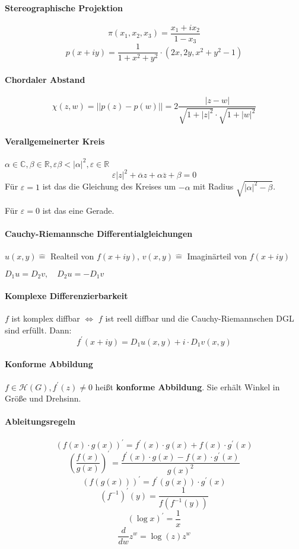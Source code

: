 \documentclass[a4paper, 10pt, DIV20, headings=small]{scrartcl}
\theoremstyle{definition}
\theoremstyle{plain}
\begin{document}
\paragraph{Stereographische Projektion}
$$\pi(x_1,x_2,x_3) = \frac{x_1 + i x_2}{1 - x_3}$$
$$p(x+iy) = \frac{1}{1+x^2+y^2}\cdot (2x, 2y, x^2+y^2-1)$$

\paragraph{Chordaler Abstand}
$$\chi (z,w) = ||p(z)-p(w)|| = 2 \frac{|z-w|}{\sqrt{1+|z|^2} \cdot \sqrt{1+|w|^2}}$$

\paragraph{Verallgemeinerter Kreis}
$\alpha \in \mathbb{C}, \beta \in \mathbb{R}, \varepsilon \beta < |\alpha|^2, \varepsilon \in \mathbb{R}$
$$\varepsilon |z|^2 + \overline{\alpha}z + \alpha \overline{z} + \beta = 0$$
Für $\varepsilon = 1$ ist das die Gleichung des Kreises um $- \alpha$ mit Radius $\sqrt{|\alpha|^2-\beta}$.

Für $\varepsilon = 0$ ist das eine Gerade.

\paragraph{Cauchy-Riemannsche Differentialgleichungen}
$u(x,y) \hat{=}$ Realteil von $f(x+iy)$, 
$v(x,y) \hat{=}$ Imaginärteil von $f(x+iy)$

$D_1u = D_2v,\quad D_2u = -D_1v$

\paragraph{Komplexe Differenzierbarkeit}
$f$ ist komplex diffbar $\Leftrightarrow$ $f$ ist reell diffbar und die Cauchy-Riemannschen DGL sind erfüllt. Dann:
$$f^\prime(x + iy) = D_1 u(x, y) + i \cdot D_1 v(x, y)$$

\paragraph{Konforme Abbildung}
$f \in \mathcal{H}(G), f^\prime(z) \neq 0$ heißt \textbf{konforme Abbildung}. Sie erhält Winkel in Größe und Drehsinn.


\paragraph{Ableitungsregeln}
$$\left(f(x) \cdot g(x)\right)^\prime = f^\prime(x) \cdot g(x) + f(x) \cdot g^\prime(x)$$
$$\left(\frac{f(x)}{g(x)}\right)^\prime = \frac{f^\prime(x) \cdot g(x) - f(x) \cdot g^\prime(x)}{g(x)^2}$$
$$\left(f(g(x))\right)^\prime = f^\prime(g(x)) \cdot g^\prime(x)$$
$$(f^{-1})^\prime(y) = \frac{1}{f(f^{-1}(y))}$$
$$(\log x)^\prime = \frac{1}{x}$$
$$\frac{d}{dw} z^w = \log(z) z^w$$
\end{document}
